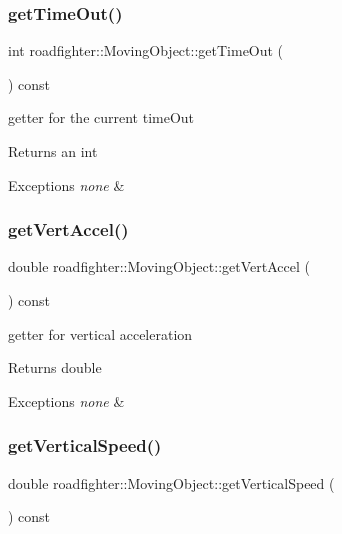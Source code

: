 \subsubsection{\texorpdfstring{get\+Time\+Out()}{getTimeOut()}}
{\footnotesize\ttfamily int roadfighter\+::\+Moving\+Object\+::get\+Time\+Out (\begin{DoxyParamCaption}{ }\end{DoxyParamCaption}) const}

getter for the current time\+Out \begin{DoxyReturn}{Returns}
an int 
\end{DoxyReturn}

\begin{DoxyExceptions}{Exceptions}
{\em none} & \\
\hline
\end{DoxyExceptions}
\mbox{\label{classroadfighter_1_1MovingObject_a299e4d456864595ba066c89f7de58afe}} 
\subsubsection{\texorpdfstring{get\+Vert\+Accel()}{getVertAccel()}}
{\footnotesize\ttfamily double roadfighter\+::\+Moving\+Object\+::get\+Vert\+Accel (\begin{DoxyParamCaption}{ }\end{DoxyParamCaption}) const}

getter for vertical acceleration \begin{DoxyReturn}{Returns}
double 
\end{DoxyReturn}

\begin{DoxyExceptions}{Exceptions}
{\em none} & \\
\hline
\end{DoxyExceptions}
\mbox{\label{classroadfighter_1_1MovingObject_a50a29cec3ac0234325691f2efd0e7fe1}} 
\subsubsection{\texorpdfstring{get\+Vertical\+Speed()}{getVerticalSpeed()}}
{\footnotesize\ttfamily double roadfighter\+::\+Moving\+Object\+::get\+Vertical\+Speed (\begin{DoxyParamCaption}{ }\end{DoxyParamCaption}) const}

